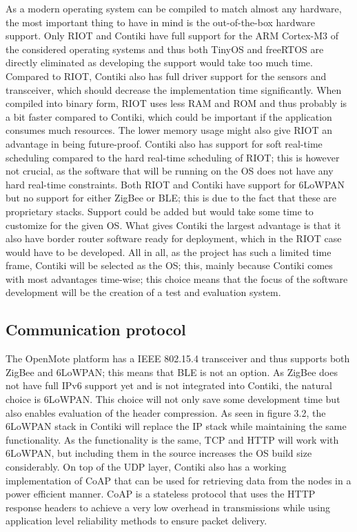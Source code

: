 As a modern operating system can be compiled to match almost any hardware,
	the most important thing to have in mind is the out-of-the-box hardware support.
Only RIOT and Contiki have full support for the ARM Cortex-M3 of the considered operating systems and thus both TinyOS and freeRTOS are directly eliminated as developing the support would take too much time.
Compared to RIOT,
	Contiki also has full driver support for the sensors and transceiver,
	which should decrease the implementation time significantly.
When compiled into binary form,
	RIOT uses less RAM and ROM and thus probably is a bit faster compared to Contiki,
	which could be important if the application consumes much resources.
The lower memory usage might also give RIOT an advantage in being future-proof.
Contiki also has support for soft real-time scheduling compared to the hard real-time scheduling of RIOT;
	this is however not crucial,
	as the software that will be running on the OS does not have any hard real-time constraints.
Both RIOT and Contiki have support for 6LoWPAN but no support for either ZigBee or BLE;
	this is due to the fact that these are proprietary stacks.
Support could be added but would take some time to customize for the given OS.
What gives Contiki the largest advantage is that it also have border router software ready for deployment,
	which in the RIOT case would have to be developed.
All in all,
	as the project has such a limited time frame,
	Contiki will be selected as the OS;
	this,
	mainly because Contiki comes with most advantages time-wise;
	this choice means that the focus of the software development will be the creation of a test and evaluation system.

\subsection{Communication protocol}


The OpenMote platform has a IEEE 802.15.4 transceiver and thus supports both ZigBee and 6LoWPAN;
	this means that BLE is not an option.
As ZigBee does not have full IPv6 support yet and is not integrated into Contiki,
	the natural choice is 6LoWPAN.
This choice will not only save some development time but also enables evaluation of the header compression.
As seen in figure 3.2,
	the 6LoWPAN stack in Contiki will replace the IP stack while maintaining the same functionality.
As the functionality is the same,
	TCP and HTTP will work with 6LoWPAN,
	but including them in the source increases the OS build size considerably.
On top of the UDP layer,
	Contiki also has a working implementation of CoAP that can be used for retrieving data from the nodes in a power efficient manner.
CoAP is a stateless protocol that uses the HTTP response headers to achieve a very low overhead in transmissions while using application level reliability methods to ensure packet delivery.

